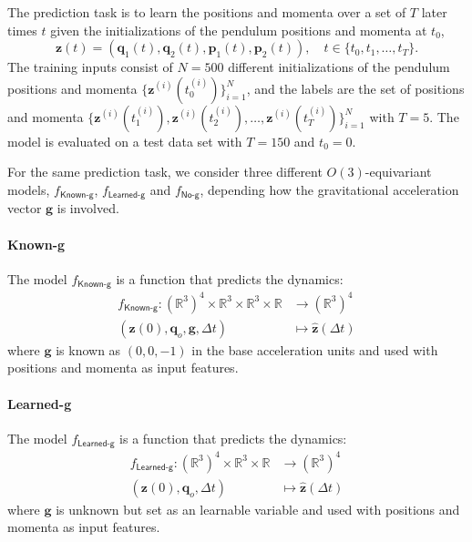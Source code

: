 \documentclass[preprint]{article} %
\begin{document}
The prediction task is to learn the positions and momenta over a set of $T$ later times $t$ given the initializations of the pendulum positions and momenta at $t_0$,
\begin{equation}
\mathbf{z}(t)=(\mathbf{q}_1(t),\mathbf{q}_2(t),\mathbf{p}_1(t),\mathbf{p}_2(t)), \quad t\in\{t_0, t_1,\ldots,t_T\}. 
\end{equation}
The training inputs consist of $N=500$ different initializations of the pendulum positions and momenta $\{\mathbf{z}^{(i)}(t_0^{(i)})\}_{i=1}^N$, and the labels are the set of positions and momenta $\{\mathbf{z}^{(i)}(t_1^{(i)}),\mathbf{z}^{(i)}(t_2^{(i)}),\ldots,\mathbf{z}^{(i)}(t_T^{(i)})\}_{i=1}^N$ with $T=5$.
The model is evaluated on a test data set with $T=150$ and $t_0=0$. 

For the same prediction task, we consider three different $O(3)$-equivariant models, $f_{\textsf{Known-g}}$, $f_{\textsf{Learned-g}}$ and $f_{\textsf{No-g}}$, depending how the gravitational acceleration vector $\mathbf{g}$ is involved. 
\paragraph{Known-g} The model $f_{\textsf{Known-g}}$ is a function that predicts the dynamics: 
\begin{equation}
\begin{aligned}
    f_{\textsf{Known-g}}: (\mathbb R^3)^4\times \mathbb{R}^3 \times \mathbb{R}^3 \times \mathbb R &\to (\mathbb R^{3})^4  \\
    (\mathbf{z}(0),\mathbf{q}_o,\mathbf{g},\Delta t) &\mapsto  \mathbf{\hat z}(\Delta t) 
\end{aligned}\label{eq:goal_F_know-g}
\end{equation}
where $\mathbf{g}$ is known as $(0,0,-1)$ in the base acceleration units and used with positions and momenta as input features.  

\paragraph{Learned-g} The model $f_{\textsf{Learned-g}}$ is a function that predicts the dynamics: 
\begin{equation}
\begin{aligned}
    f_{\textsf{Learned-g}}: (\mathbb R^3)^4 \times \mathbb{R}^3 \times \mathbb R &\to (\mathbb R^{3})^4  \\
    (\mathbf{z}(0),\mathbf{q}_o, \Delta t) &\mapsto  \mathbf{\hat z}(\Delta t) 
\end{aligned}\label{eq:goal_F_learn-g}
\end{equation}
where $\mathbf{g}$ is unknown but set as an learnable variable and used with positions and momenta as input features.   
\end{document}
